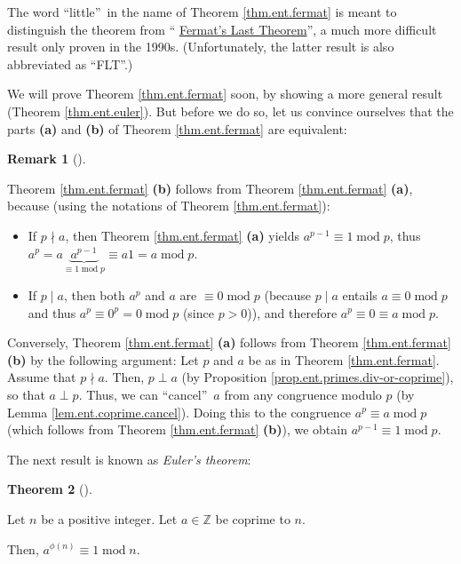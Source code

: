 \documentclass[numbers=enddot,12pt,final,onecolumn,notitlepage]{scrartcl}%
\numberwithin{exer}{subsection}
\theoremstyle{definition}
\newtheorem{theo}{Theorem}[subsection]
\newenvironment{theorem}[1][]
{\begin{theo}[#1]\begin{leftbar}}
{\end{leftbar}\end{theo}}
\newtheorem{remk}[theo]{Remark}
\newenvironment{remark}[1][]
{\begin{remk}[#1]\begin{leftbar}}
{\end{leftbar}\end{remk}}
\begin{document}
The word \textquotedblleft little\textquotedblright\ in the name of Theorem
\ref{thm.ent.fermat} is meant to distinguish the theorem from
\textquotedblleft%
\href{https://en.wikipedia.org/wiki/Fermat's_Last_Theorem}{Fermat's Last
Theorem}\textquotedblright, a much more difficult result only proven in the
1990s. (Unfortunately, the latter result is also abbreviated as
\textquotedblleft FLT\textquotedblright.)

We will prove Theorem \ref{thm.ent.fermat} soon, by showing a more general
result (Theorem \ref{thm.ent.euler}). But before we do so, let us convince
ourselves that the parts \textbf{(a)} and \textbf{(b)} of Theorem
\ref{thm.ent.fermat} are equivalent:

\begin{remark}
Theorem \ref{thm.ent.fermat} \textbf{(b)} follows from Theorem
\ref{thm.ent.fermat} \textbf{(a)}, because (using the notations of Theorem
\ref{thm.ent.fermat}):

\begin{itemize}
\item If $p\nmid a$, then Theorem \ref{thm.ent.fermat} \textbf{(a)} yields
$a^{p-1}\equiv1\operatorname{mod}p$, thus $a^{p}=a\underbrace{a^{p-1}}%
_{\equiv1\operatorname{mod}p}\equiv a1=a\operatorname{mod}p$.

\item If $p\mid a$, then both $a^{p}$ and $a$ are $\equiv0\operatorname{mod}p$
(because $p\mid a$ entails $a\equiv0\operatorname{mod}p$ and thus $a^{p}%
\equiv0^{p}=0\operatorname{mod}p$ (since $p>0$)), and therefore $a^{p}%
\equiv0\equiv a\operatorname{mod}p$.
\end{itemize}

Conversely, Theorem \ref{thm.ent.fermat} \textbf{(a)} follows from Theorem
\ref{thm.ent.fermat} \textbf{(b)} by the following argument: Let $p$ and $a$
be as in Theorem \ref{thm.ent.fermat}. Assume that $p\nmid a$. Then, $p\perp
a$ (by Proposition \ref{prop.ent.primes.div-or-coprime}), so that $a\perp p$.
Thus, we can \textquotedblleft cancel\textquotedblright\ $a$ from any
congruence modulo $p$ (by Lemma \ref{lem.ent.coprime.cancel}). Doing this to
the congruence $a^{p}\equiv a\operatorname{mod}p$ (which follows from Theorem
\ref{thm.ent.fermat} \textbf{(b)}), we obtain $a^{p-1}\equiv
1\operatorname{mod}p$.
\end{remark}

The next result is known as \textit{Euler's theorem}:

\begin{theorem}
\label{thm.ent.euler}Let $n$ be a positive integer. Let $a\in\mathbb{Z}$ be
coprime to $n$.

Then, $a^{\phi\left(  n\right)  }\equiv1\operatorname{mod}n$.
\end{theorem}
\end{document}
